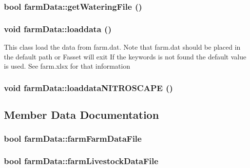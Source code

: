 \label{classfarm_data_a254a19218188f4e0144d1d64eb15359f}
\hypertarget{classfarm_data_a2647fba9e3eeb43dc9bb4c3df245f7f1}{
\subsubsection[{getWateringFile}]{\setlength{\rightskip}{0pt plus 5cm}bool farmData::getWateringFile ()}}
\label{classfarm_data_a2647fba9e3eeb43dc9bb4c3df245f7f1}
\hypertarget{classfarm_data_acc1cdf104c536ccf1c9d882dbdd23741}{
\subsubsection[{loaddata}]{\setlength{\rightskip}{0pt plus 5cm}void farmData::loaddata ()}}
\label{classfarm_data_acc1cdf104c536ccf1c9d882dbdd23741}
This class load the data from farm.dat. Note that farm.dat should be placed in the default path or Fasset will exit If the keywords is not found the default value is used. See farm.xlsx for that information \hypertarget{classfarm_data_a876db3cf0dd016c20f850a14ec435f1d}{
\subsubsection[{loaddataNITROSCAPE}]{\setlength{\rightskip}{0pt plus 5cm}void farmData::loaddataNITROSCAPE ()}}
\label{classfarm_data_a876db3cf0dd016c20f850a14ec435f1d}


\subsection{Member Data Documentation}
\hypertarget{classfarm_data_a978fb6c1e7912cc1629ebc07f4633065}{
\subsubsection[{farmFarmDataFile}]{\setlength{\rightskip}{0pt plus 5cm}bool {\bf farmData::farmFarmDataFile}}}
\label{classfarm_data_a978fb6c1e7912cc1629ebc07f4633065}
\hypertarget{classfarm_data_affca61735fb74aa47fe3047f5f2c1a5d}{
\subsubsection[{farmLivestockDataFile}]{\setlength{\rightskip}{0pt plus 5cm}bool {\bf farmData::farmLivestockDataFile}}}
\label{classfarm_data_affca61735fb74aa47fe3047f5f2c1a5d}


